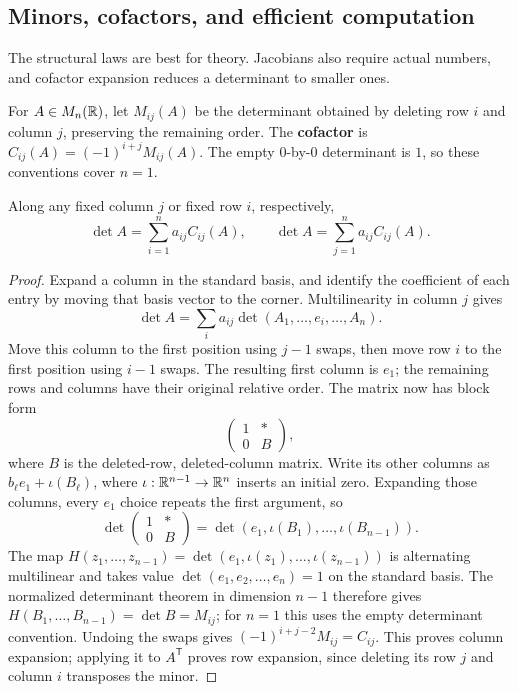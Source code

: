\subsection*{Minors, cofactors, and efficient computation}
The structural laws are best for theory. Jacobians also require actual
numbers, and cofactor expansion reduces a determinant to smaller ones.
\begin{definition}
For $A\in M_n(\mathbb{R})$, let $M_{ij}(A)$ be the determinant obtained by
deleting row $i$ and column $j$, preserving the remaining order.
The \textbf{cofactor} is $C_{ij}(A)=(-1)^{i+j}M_{ij}(A)$.
The empty $0$-by-$0$ determinant is $1$, so these conventions cover $n=1$.
\end{definition}
\begin{theorem}
\label{thm:laplace-expansion}
Along any fixed column $j$ or fixed row $i$, respectively,
\[
\det A=\sum_{i=1}^n a_{ij}C_{ij}(A),\qquad
\det A=\sum_{j=1}^n a_{ij}C_{ij}(A).
\]
\end{theorem}
\begin{proof}
Expand a column in the standard basis, and identify the
coefficient of each entry by moving that basis vector to the corner.
Multilinearity in column $j$ gives
\[
\det A=\sum_i a_{ij}\det(A_1,\ldots,e_i,\ldots,A_n).
\]
Move this column to the first position using $j-1$ swaps, then move row
$i$ to the first position using $i-1$ swaps. The resulting first column
is $e_1$; the remaining rows and columns have their original relative order.
The matrix now has block form
\[
\begin{pmatrix}1&*\\0&B\end{pmatrix},
\]
where $B$ is the deleted-row, deleted-column matrix. Write its other
columns as $b_\ell e_1+\iota(B_\ell)$, where
$\iota:\mathbb{R}^{n-1}\to\mathbb{R}^n$ inserts an initial zero. Expanding those columns,
every $e_1$ choice repeats the first argument, so
\[
\det\begin{pmatrix}1&*\\0&B\end{pmatrix}
=\det(e_1,\iota(B_1),\ldots,\iota(B_{n-1})).
\]
The map $H(z_1,\ldots,z_{n-1})=
\det(e_1,\iota(z_1),\ldots,\iota(z_{n-1}))$ is alternating multilinear
and takes value $\det(e_1,e_2,\ldots,e_n)=1$ on the standard basis.
The normalized determinant theorem in dimension $n-1$ therefore gives
$H(B_1,\ldots,B_{n-1})=\det B=M_{ij}$; for $n=1$ this uses the empty
determinant convention.
Undoing the swaps gives $(-1)^{i+j-2}M_{ij}=C_{ij}$.
This proves column expansion; applying it to $A^{\mathsf T}$ proves row
expansion, since deleting its row $j$ and column $i$ transposes the minor.
\end{proof}


